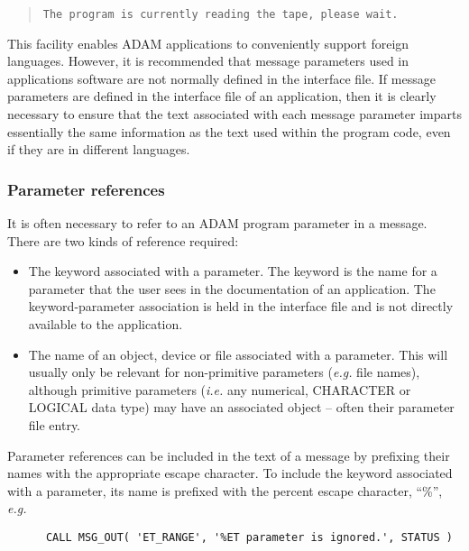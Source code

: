 \begin {quote}
\begin {small}
\begin{verbatim}
The program is currently reading the tape, please wait.
\end{verbatim}
\end {small}
\end {quote}

This facility enables ADAM applications to conveniently support foreign
languages. 
However, it is recommended that message parameters used in applications
software are not normally defined in the interface file.
If message parameters are defined in the interface file of an application,
then it is clearly necessary to ensure that the text associated with each
message parameter imparts essentially the same information as the text used
within the program code, even if they are in different languages. 


\subsubsection {Parameter references}

It is often necessary to refer to an ADAM program parameter in a message. 
There are two kinds of reference required: 

\begin {itemize}
\item The keyword associated with a parameter. 
The keyword is the name for a parameter that the user sees in the 
documentation of an application. 
The keyword-parameter association is held in the interface file and is
not directly available to the application. 

\item The name of an object, device or file associated with a parameter. 
This will usually only be relevant for non-primitive parameters ({\em e.g.} file 
names), although primitive parameters ({\em i.e.} any numerical, CHARACTER or LOGICAL 
data type) may have an associated object -- often their parameter file
entry.
\end {itemize}

Parameter references can be included in the text of a message by prefixing 
their names with the appropriate escape character. 
To include the keyword associated with a parameter, its name is prefixed with
the percent escape character, ``\%'', {\em e.g.} 

\begin {small}
\begin{verbatim}
      CALL MSG_OUT( 'ET_RANGE', '%ET parameter is ignored.', STATUS )
\end{verbatim}
\end {small}

